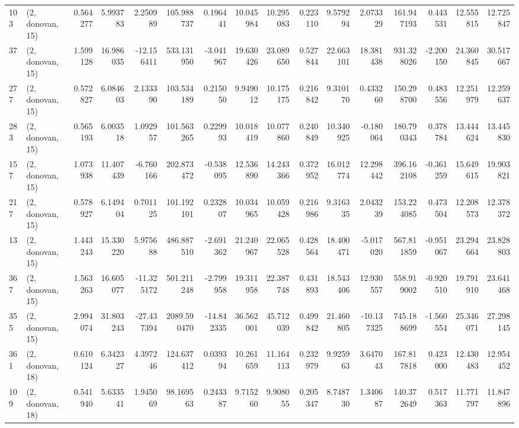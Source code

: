 \begin{tabular}{llrrrrrrrrrrrrrr}
103 &  (2, donovan, 15) &   0.564277 &   5.993783 &   2.250989 &   105.988737 &   0.196441 &  10.045984 &  10.295083 &  0.223110 &   9.579294 &   2.073329 &   161.947193 &  0.443531 &  12.555815 &  12.725847 \\
37  &  (2, donovan, 15) &   1.599128 &  16.986035 & -12.156411 &   533.131950 &  -3.041967 &  19.630426 &  23.089650 &  0.527844 &  22.663101 &  18.381438 &   931.328026 & -2.200150 &  24.360845 &  30.517667 \\
277 &  (2, donovan, 15) &   0.572827 &   6.084603 &   2.133390 &   103.534189 &   0.215050 &   9.949012 &  10.175175 &  0.216842 &   9.310170 &   0.433260 &   150.298700 &  0.483556 &  12.251979 &  12.259637 \\
283 &  (2, donovan, 15) &   0.565193 &   6.003518 &   1.092957 &   101.563265 &   0.229993 &  10.018419 &  10.077860 &  0.240849 &  10.340925 &  -0.180064 &   180.790343 &  0.378784 &  13.444624 &  13.445830 \\
157 &  (2, donovan, 15) &   1.073938 &  11.407439 &  -6.760166 &   202.873472 &  -0.538095 &  12.536890 &  14.243366 &  0.372952 &  16.012774 &  12.298442 &   396.162108 & -0.361259 &  15.649615 &  19.903821 \\
217 &  (2, donovan, 15) &   0.578927 &   6.149404 &   0.701125 &   101.192101 &   0.232807 &  10.034965 &  10.059428 &  0.216986 &   9.316335 &   2.043239 &   153.224085 &  0.473504 &  12.208573 &  12.378372 \\
13  &  (2, donovan, 15) &   1.443243 &  15.330220 &   5.975688 &   486.887510 &  -2.691362 &  21.240967 &  22.065528 &  0.428564 &  18.400471 &  -5.017020 &   567.811859 & -0.951067 &  23.294664 &  23.828803 \\
367 &  (2, donovan, 15) &   1.563263 &  16.605077 & -11.325172 &   501.211248 &  -2.799958 &  19.311958 &  22.387748 &  0.431893 &  18.543406 &  12.930557 &   558.919002 & -0.920510 &  19.791910 &  23.641468 \\
355 &  (2, donovan, 15) &   2.994074 &  31.803243 & -27.437394 &  2089.590470 & -14.842335 &  36.562001 &  45.712039 &  0.499842 &  21.460805 & -10.137325 &   745.188699 & -1.560554 &  25.346071 &  27.298145 \\
361 &  (2, donovan, 18) &   0.610124 &   6.342327 &   4.397246 &   124.637412 &   0.039394 &  10.261659 &  11.164113 &  0.232979 &   9.925963 &   3.647043 &   167.817818 &  0.423000 &  12.430483 &  12.954452 \\
109 &  (2, donovan, 18) &   0.541940 &   5.633541 &   1.945069 &    98.169563 &   0.243387 &   9.715260 &   9.908055 &  0.205347 &   8.748730 &   1.340687 &   140.372649 &  0.517363 &  11.771797 &  11.847896 \\

\end{tabular}
